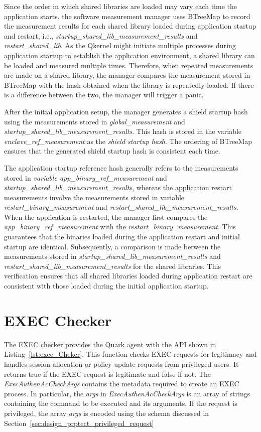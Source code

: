 Since the order in which shared libraries are loaded may vary each time the application starts, the software measurement manager uses BTreeMap to record the measurement results for each shared library loaded during application startup and restart, i.e., \emph{startup\_shared\_lib\_measurement\_results} 
and \emph{restart\_shared\_lib}. As the Qkernel might initiate multiple processes during application startup to establish the application environment, a shared library can be loaded and measured multiple times. Therefore, when repeated measurements are made on a shared library, the manager compares 
the measurement stored in BTreeMap with the hash obtained when the library is repeatedly loaded. If there is a difference between the two, the manager will trigger a panic.


After the initial application setup, the manager generates a shield startup hash using the measurements stored in \emph{global\_measurement} and \emph{startup\_shared\_lib\_measurement\_results}. This hash is stored in the variable 
\emph{enclave\_ref\_measurement} as the \emph{shield startup hash}. The ordering of BTreeMap ensures that the generated shield startup hash is consistent each time.

The application startup reference hash generally refers to the measurements stored in \emph{variable app\_binary\_ref\_measurement} and \emph{startup\_shared\_lib\_measurement\_results}, whereas the application restart measurements involve the measurements stored in 
variable \emph{restart\_binary\_measurement} and \emph{restart\_shared\_lib\_measurement\_results}. When the application is restarted, the manager first compares the \emph{app\_binary\_ref\_measurement} with the \emph{restart\_binary\_measurement}. This guarantees that the binaries loaded during 
the application restart and initial startup are identical. Subsequently, a comparison is made between the measurements stored in \emph{startup\_shared\_lib\_measurement\_results} and \emph{restart\_shared\_lib\_measurement\_results} for the shared libraries. This verification ensures that all 
shared libraries loaded during application restart are consistent with those loaded during the initial application startup.



\section{EXEC Checker}
\label{sec:impl_exec}
The EXEC checker provides the Quark agent with the API shown in Listing~\ref{lst:exec_Cheker}. This function checks EXEC requests for legitimacy and handles session allocation or policy update requests from privileged users. It returns true if the EXEC request is legitimate and false if not. 
The \emph{ExecAuthenAcCheckArgs} contains the metadata required to create an EXEC process. In particular, the \emph{args} in \emph{ExecAuthenAcCheckArgs} is an array of strings containing the command to be executed and its arguments. If the request is privileged, the array \emph{args} is encoded 
using the schema discussed in Section~\ref{sec:design_prptect_privileged_request}

